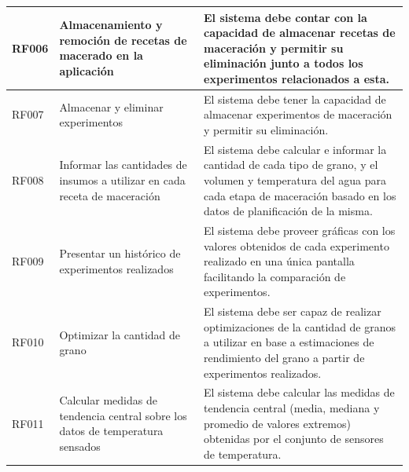 \begin{longtable}[H]{|p{1.4cm}|p{3.1cm}|p{9.5cm}|}
        RF006 & Almacenamiento y remoción de recetas de macerado en la aplicación & El sistema debe contar con la capacidad de almacenar recetas de maceración y permitir su eliminación junto a  todos los experimentos relacionados a esta.
        \\\hline
        
        RF007 & Almacenar y eliminar experimentos  & El sistema debe tener la capacidad de almacenar experimentos de maceración y permitir su eliminación.
        \\\hline
        
        RF008 & Informar las cantidades de insumos a utilizar en cada receta de maceración & El sistema debe calcular e informar la cantidad de cada tipo de grano, y el volumen y temperatura del agua para cada etapa de maceración basado en los datos de planificación de la misma.
        \\\hline
        
        RF009 & Presentar un histórico de experimentos realizados & El sistema debe proveer gráficas con los valores obtenidos de cada experimento realizado en una única pantalla facilitando la comparación de experimentos.
        \\\hline
        
        RF010 & Optimizar la cantidad de grano & El sistema debe ser capaz de realizar optimizaciones de la cantidad de granos a utilizar en base a estimaciones de rendimiento del grano a partir de experimentos realizados.
         \\\hline
        RF011 & Calcular medidas de tendencia central sobre los datos de temperatura sensados & El sistema debe calcular las medidas de tendencia central (media, mediana y promedio de valores extremos) obtenidas por el conjunto de sensores de temperatura.
        \\\hline
 \end{longtable}
   
    
 
 
 
